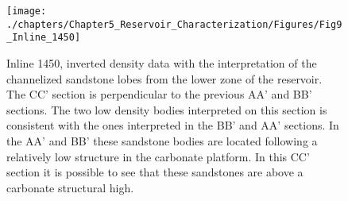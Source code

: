 \begin{figure}[hbtp]
	\begin{center}
	\texttt{[image: ./chapters/Chapter5\_Reservoir\_Characterization/Figures/Fig9\_Inline\_1450]}
			\caption[Inline 1450, inverted density data with the interpretation of the channelized sandstone lobes from the lower zone of the reservoir.]{Inline 1450, inverted density data with the interpretation of the channelized sandstone lobes from the lower zone of the reservoir. The CC' section is perpendicular to the previous AA' and BB' sections. The two low density bodies interpreted on this section is consistent with the ones interpreted in the BB' and AA' sections. In the AA' and BB' these sandstone bodies are located following a relatively low structure in the carbonate platform. In this CC' section it is possible to see that these sandstones are above a carbonate structural high. }
			\label{fig:1450}
		\end{center}
	\end{figure}








